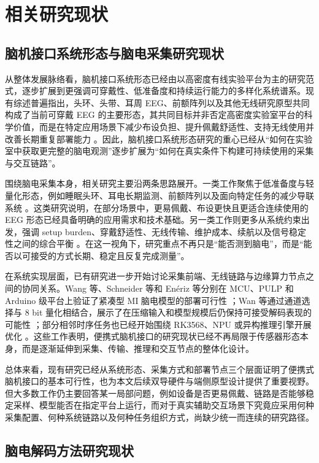 \section{相关研究现状}
\subsection{脑机接口系统形态与脑电采集研究现状}

从整体发展脉络看，脑机接口系统形态已经由以高密度有线实验平台为主的研究范式，逐步扩展到更强调可穿戴性、低准备度和持续运行能力的多样化系统谱系。现有综述普遍指出，头环、头带、耳周 EEG、前额阵列以及其他无线研究原型共同构成了当前可穿戴 EEG 的主要形态，其共同目标并非否定高密度实验室平台的科学价值，而是在特定应用场景下减少布设负担、提升佩戴舒适性、支持无线使用并改善长期重复部署能力 \cite{Cas19c, Nis22, He23}。因此，脑机接口系统形态研究的重心已经从“如何在实验室中获取更完整的脑电观测”逐步扩展为“如何在真实条件下构建可持续使用的采集与交互链路”。

围绕脑电采集本身，相关研究主要沿两条思路展开。一类工作聚焦于低准备度与轻量化形态，例如睡眠头环、耳电长期监测、前额阵列以及面向特定任务的减少导联系统 \cite{Arn20, Deb15, Bio22}。这类研究说明，在部分场景中，更易佩戴、布设更快且更适合连续使用的 EEG 形态已经具备明确的应用需求和技术基础。另一类工作则更多从系统约束出发，强调 setup burden、穿戴舒适性、无线传输、维护成本、续航以及信号稳定性之间的综合平衡 \cite{Cas19c, Nis22, He23}。在这一视角下，研究重点不再只是“能否测到脑电”，而是“能否以可接受的方式长期、稳定且反复完成测量”。

在系统实现层面，已有研究进一步开始讨论采集前端、无线链路与边缘算力节点之间的协同关系。Wang 等、Schneider 等和 En\'eriz 等分别在 MCU、PULP 和 Arduino 级平台上验证了紧凑型 MI 脑电模型的部署可行性 \cite{Wan20, Sch20, Ene23}；Wan 等通过通道选择与 8 bit 量化相结合，展示了在压缩输入和模型规模后仍保持可接受解码表现的可能性 \cite{Wan22b}；部分相邻时序任务也已经开始围绕 RK3568、NPU 或异构推理引擎开展优化 \cite{You24, Ism23}。这些工作表明，便携式脑机接口的研究现状已经不再局限于传感器形态本身，而是逐渐延伸到采集、传输、推理和交互节点的整体化设计。

总体来看，现有研究已经从系统形态、采集方式和部署节点三个层面证明了便携式脑机接口的基本可行性，也为本文后续双导硬件与端侧原型设计提供了重要视野。但大多数工作仍主要回答某一局部问题，例如设备是否更易佩戴、链路是否能够稳定采样、模型能否在指定平台上运行，而对于真实辅助交互场景下究竟应采用何种采集配置、何种系统链路以及何种任务组织方式，尚缺少统一而连续的研究路径。

\subsection{脑电解码方法研究现状}

